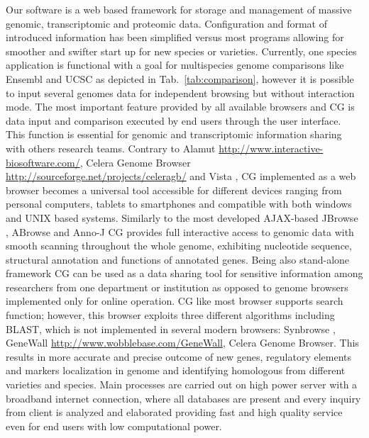 \documentclass[]{spie}
\newcommand{\appShortcut}{CG}
\begin{document}
Our software is a web based framework for storage and management of massive genomic, transcriptomic and proteomic data.
Configuration and format of introduced information has been simplified versus most programs allowing for smoother and swifter start up for new species or varieties.
Currently, one species application is functional with a goal for multispecies genome comparisons like  Ensembl and UCSC as depicted in Tab.~\ref{tab:comparison},
however it is possible to input several genomes data for independent browsing  but without interaction mode.
The most important feature provided by all available browsers and \appShortcut{} is data input and comparison executed by end users through the user interface.
This function is essential for genomic and transcriptomic information sharing with others research teams.
Contrary to Alamut \url{http://www.interactive-biosoftware.com/}, Celera Genome Browser \url{http://sourceforge.net/projects/celeragb/}
and Vista \cite{visel2007vista}, \appShortcut{} implemented as a web browser becomes a universal tool accessible for different devices ranging from personal computers,
tablets to smartphones and compatible with both windows and UNIX based systems.
Similarly to the most developed AJAX-based JBrowse \cite{skinner2009jbrowse}, ABrowse \cite{kong2012abrowse} and Anno-J \cite{lister2008highly}
\appShortcut{} provides full interactive access to genomic data with smooth scanning throughout the whole genome,
exhibiting nucleotide sequence, structural annotation and functions of annotated genes.
Being also stand-alone framework \appShortcut{} can be used as a data sharing tool for sensitive information
among researchers from one department or institution as opposed to genome browsers implemented only for online operation.
\appShortcut{} like most browser supports search function; however, this browser exploits three different algorithms including BLAST,
which is not implemented in several modern browsers: Synbrowse \cite{pan2005synbrowse}, GeneWall \url{http://www.wobblebase.com/GeneWall},
Celera Genome Browser.
This results in more accurate and precise outcome of new genes, regulatory elements and markers localization in genome and identifying homologous
from different varieties and species.
Main processes are carried out on  high power server with a broadband internet connection,
where all databases are present and every inquiry from client is analyzed and elaborated providing fast and high quality service
even for end users with low computational power.
\end{document}
